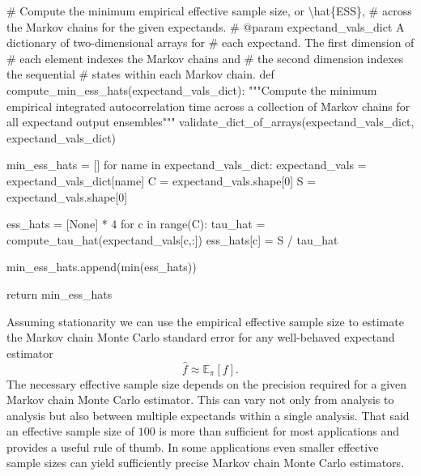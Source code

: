 \documentclass[
  letterpaper,
  DIV=11,
  numbers=noendperiod]{scrartcl}
\newenvironment{Shaded}{\begin{snugshade}}{\end{snugshade}}
\newcommand{\BuiltInTok}[1]{\textcolor[rgb]{0.00,0.23,0.31}{#1}}
\newcommand{\CommentTok}[1]{\textcolor[rgb]{0.37,0.37,0.37}{#1}}
\newcommand{\ControlFlowTok}[1]{\textcolor[rgb]{0.00,0.23,0.31}{#1}}
\newcommand{\DecValTok}[1]{\textcolor[rgb]{0.68,0.00,0.00}{#1}}
\newcommand{\KeywordTok}[1]{\textcolor[rgb]{0.00,0.23,0.31}{#1}}
\newcommand{\NormalTok}[1]{\textcolor[rgb]{0.00,0.23,0.31}{#1}}
\newcommand{\OperatorTok}[1]{\textcolor[rgb]{0.37,0.37,0.37}{#1}}
\newcommand{\StringTok}[1]{\textcolor[rgb]{0.13,0.47,0.30}{#1}}
\newcommand{\VariableTok}[1]{\textcolor[rgb]{0.07,0.07,0.07}{#1}}
\begin{document}
\begin{Shaded}
\begin{Highlighting}[]
\CommentTok{\# Compute the minimum empirical effective sample size, or \textbackslash{}hat\{ESS\},}
\CommentTok{\# across the Markov chains for the given expectands.}
\CommentTok{\# @param expectand\_vals\_dict A dictionary of two{-}dimensional arrays for}
\CommentTok{\#                            each expectand.  The first dimension of}
\CommentTok{\#                            each element indexes the Markov chains and}
\CommentTok{\#                            the second dimension indexes the sequential}
\CommentTok{\#                            states within each Markov chain.}
\KeywordTok{def}\NormalTok{ compute\_min\_ess\_hats(expectand\_vals\_dict):}
  \CommentTok{"""Compute the minimum empirical integrated autocorrelation time}
\CommentTok{     across a collection of Markov chains for all expectand output}
\CommentTok{     ensembles"""}
\NormalTok{  validate\_dict\_of\_arrays(expectand\_vals\_dict, }\StringTok{\textquotesingle{}expectand\_vals\_dict\textquotesingle{}}\NormalTok{)}
      
\NormalTok{  min\_ess\_hats }\OperatorTok{=}\NormalTok{ []}
  \ControlFlowTok{for}\NormalTok{ name }\KeywordTok{in}\NormalTok{ expectand\_vals\_dict:}
\NormalTok{    expectand\_vals }\OperatorTok{=}\NormalTok{ expectand\_vals\_dict[name]}
\NormalTok{    C }\OperatorTok{=}\NormalTok{ expectand\_vals.shape[}\DecValTok{0}\NormalTok{]}
\NormalTok{    S }\OperatorTok{=}\NormalTok{ expectand\_vals.shape[}\DecValTok{0}\NormalTok{]}
    
\NormalTok{    ess\_hats }\OperatorTok{=}\NormalTok{ [}\VariableTok{None}\NormalTok{] }\OperatorTok{*} \DecValTok{4}
    \ControlFlowTok{for}\NormalTok{ c }\KeywordTok{in} \BuiltInTok{range}\NormalTok{(C):}
\NormalTok{      tau\_hat }\OperatorTok{=}\NormalTok{ compute\_tau\_hat(expectand\_vals[c,:])}
\NormalTok{      ess\_hats[c] }\OperatorTok{=}\NormalTok{ S }\OperatorTok{/}\NormalTok{ tau\_hat}
    
\NormalTok{    min\_ess\_hats.append(}\BuiltInTok{min}\NormalTok{(ess\_hats))}
  
  \ControlFlowTok{return}\NormalTok{ min\_ess\_hats}
\end{Highlighting}
\end{Shaded}

Assuming stationarity we can use the empirical effective sample size to
estimate the Markov chain Monte Carlo standard error for any
well-behaved expectand estimator \[
\hat{f} \approx \mathbb{E}_{\pi}[f].
\] The necessary effective sample size depends on the precision required
for a given Markov chain Monte Carlo estimator. This can vary not only
from analysis to analysis but also between multiple expectands within a
single analysis. That said an effective sample size of \(100\) is more
than sufficient for most applications and provides a useful rule of
thumb. In some applications even smaller effective sample sizes can
yield sufficiently precise Markov chain Monte Carlo estimators.
\end{document}

